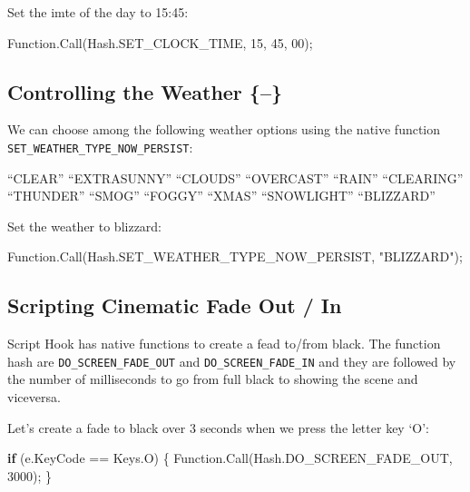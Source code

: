 \documentclass[
  openany]{book}
\newenvironment{Shaded}{\begin{snugshade}}{\end{snugshade}}
\newcommand{\DecValTok}[1]{\textcolor[rgb]{0.00,0.00,0.81}{#1}}
\newcommand{\FunctionTok}[1]{\textcolor[rgb]{0.00,0.00,0.00}{#1}}
\newcommand{\KeywordTok}[1]{\textcolor[rgb]{0.13,0.29,0.53}{\textbf{#1}}}
\newcommand{\NormalTok}[1]{#1}
\newcommand{\StringTok}[1]{\textcolor[rgb]{0.31,0.60,0.02}{#1}}
\begin{document}
Set the imte of the day to 15:45:

\begin{Shaded}
\begin{Highlighting}[]
\NormalTok{Function.}\FunctionTok{Call}\NormalTok{(Hash.}\FunctionTok{SET_CLOCK_TIME}\NormalTok{, }\DecValTok{15}\NormalTok{, }\DecValTok{45}\NormalTok{, }\DecValTok{00}\NormalTok{);}
\end{Highlighting}
\end{Shaded}

\hypertarget{controlling-the-weather}{%
\subsection{Controlling the Weather \{--\}}\label{controlling-the-weather}}

We can choose among the following weather options using the native function \texttt{SET\_WEATHER\_TYPE\_NOW\_PERSIST}:

``CLEAR''
``EXTRASUNNY''
``CLOUDS''
``OVERCAST''
``RAIN''
``CLEARING''
``THUNDER''
``SMOG''
``FOGGY''
``XMAS''
``SNOWLIGHT''
``BLIZZARD''

Set the weather to blizzard:

\begin{Shaded}
\begin{Highlighting}[]
\NormalTok{Function.}\FunctionTok{Call}\NormalTok{(Hash.}\FunctionTok{SET_WEATHER_TYPE_NOW_PERSIST}\NormalTok{, }\StringTok{"BLIZZARD"}\NormalTok{);}
\end{Highlighting}
\end{Shaded}

\hypertarget{scripting-cinematic-fade-out-in}{%
\subsection*{Scripting Cinematic Fade Out / In}\label{scripting-cinematic-fade-out-in}}

Script Hook has native functions to create a fead to/from black. The function hash are \texttt{DO\_SCREEN\_FADE\_OUT} and \texttt{DO\_SCREEN\_FADE\_IN} and they are followed by the number of milliseconds to go from full black to showing the scene and viceversa.

Let's create a fade to black over 3 seconds when we press the letter key `O':

\begin{Shaded}
\begin{Highlighting}[]
\KeywordTok{if}\NormalTok{ (e.}\FunctionTok{KeyCode}\NormalTok{ == Keys.}\FunctionTok{O}\NormalTok{)}
\NormalTok{\{}
\NormalTok{    Function.}\FunctionTok{Call}\NormalTok{(Hash.}\FunctionTok{DO_SCREEN_FADE_OUT}\NormalTok{, }\DecValTok{3000}\NormalTok{);}
\NormalTok{\}}
\end{Highlighting}
\end{Shaded}
\end{document}
